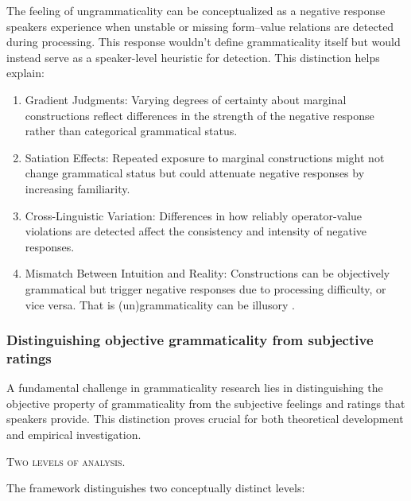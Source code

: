 \documentclass[12pt,letterpaper]{article}
\begin{document}
The feeling of ungrammaticality can be conceptualized as a negative response speakers experience when unstable or missing form--value relations are detected during processing. This response wouldn't define grammaticality itself but would instead serve as a speaker-level heuristic for detection. This distinction helps explain:

\begin{enumerate}
    \item Gradient Judgments: Varying degrees of certainty about marginal constructions reflect differences in the strength of the negative response rather than categorical grammatical status.

    \item Satiation Effects: Repeated exposure to marginal constructions might not change grammatical status but could attenuate negative responses by increasing familiarity.

    \item Cross-Linguistic Variation: Differences in how reliably operator-value violations are detected affect the consistency and intensity of negative responses.

    \item Mismatch Between Intuition and Reality: Constructions can be objectively grammatical but trigger negative responses due to processing difficulty, or vice versa. That is (un)grammaticality can be illusory \parencite{Fanselow2021}.
\end{enumerate}

\subsubsection{Distinguishing objective grammaticality from subjective ratings}\label{sec:objective-subjective}

A fundamental challenge in grammaticality research lies in distinguishing the objective property of grammaticality from the subjective feelings and ratings that speakers provide. This distinction proves crucial for both theoretical development and empirical investigation.

\textsc{Two levels of analysis.}

The framework distinguishes two conceptually distinct levels:
\end{document}
